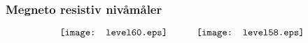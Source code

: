 \documentclass[aspectratio=169,xcolor=dvipsnames]{beamer}
\begin{document}
%
%
%
\begin{frame}
	\frametitle{Megneto resistiv nivåmåler}

$$\texttt{[image: level60.eps]} \hskip 30pt \texttt{[image: level58.eps]}$$
\end{frame}
\end{document}
